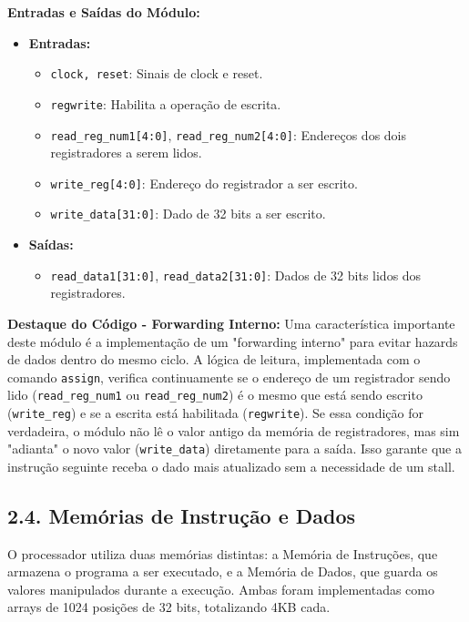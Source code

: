 \documentclass[12pt, a4paper]{article}
\begin{document}
\vspace{0.5cm}
\textbf{Entradas e Saídas do Módulo:}
\begin{itemize}
    \item \textbf{Entradas:}
    \begin{itemize}
        \item \texttt{clock, reset}: Sinais de clock e reset.
        \item \texttt{regwrite}: Habilita a operação de escrita.
        \item \texttt{read\_reg\_num1[4:0]}, \texttt{read\_reg\_num2[4:0]}: Endereços dos dois registradores a serem lidos.
        \item \texttt{write\_reg[4:0]}: Endereço do registrador a ser escrito.
        \item \texttt{write\_data[31:0]}: Dado de 32 bits a ser escrito.
    \end{itemize}
    \item \textbf{Saídas:}
    \begin{itemize}
        \item \texttt{read\_data1[31:0]}, \texttt{read\_data2[31:0]}: Dados de 32 bits lidos dos registradores.
    \end{itemize}
\end{itemize}

\textbf{Destaque do Código - Forwarding Interno:}
Uma característica importante deste módulo é a implementação de um "forwarding interno" para evitar hazards de dados dentro do mesmo ciclo. A lógica de leitura, implementada com o comando \texttt{assign}, verifica continuamente se o endereço de um registrador sendo lido (\texttt{read\_reg\_num1} ou \texttt{read\_reg\_num2}) é o mesmo que está sendo escrito (\texttt{write\_reg}) e se a escrita está habilitada (\texttt{regwrite}). Se essa condição for verdadeira, o módulo não lê o valor antigo da memória de registradores, mas sim "adianta" o novo valor (\texttt{write\_data}) diretamente para a saída. Isso garante que a instrução seguinte receba o dado mais atualizado sem a necessidade de um stall.

\subsection*{2.4. Memórias de Instrução e Dados}

O processador utiliza duas memórias distintas: a Memória de Instruções, que armazena o programa a ser executado, e a Memória de Dados, que guarda os valores manipulados durante a execução. Ambas foram implementadas como arrays de 1024 posições de 32 bits, totalizando 4KB cada.
\end{document}
